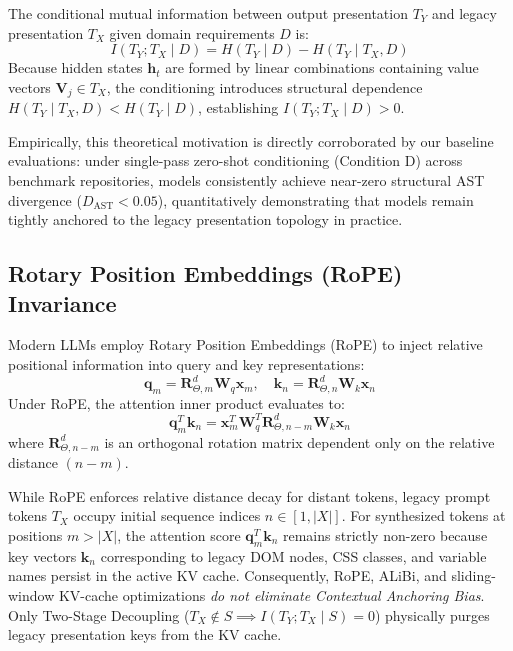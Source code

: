 \documentclass[10pt,journal,compsoc]{IEEEtran}
\begin{document}
The conditional mutual information between output presentation $T_Y$ and legacy presentation $T_X$ given domain requirements $D$ is:
\begin{equation}
I(T_Y ; T_X \mid D) = H(T_Y \mid D) - H(T_Y \mid T_X, D)
\end{equation}
Because hidden states $\mathbf{h}_t$ are formed by linear combinations containing value vectors $\mathbf{V}_j \in T_X$, the conditioning introduces structural dependence $H(T_Y \mid T_X, D) < H(T_Y \mid D)$, establishing $I(T_Y ; T_X \mid D) > 0$.

Empirically, this theoretical motivation is directly corroborated by our baseline evaluations: under single-pass zero-shot conditioning (Condition D) across benchmark repositories, models consistently achieve near-zero structural AST divergence ($D_{\text{AST}} < 0.05$), quantitatively demonstrating that models remain tightly anchored to the legacy presentation topology in practice.

\subsection{Rotary Position Embeddings (RoPE) Invariance}
Modern LLMs employ Rotary Position Embeddings (RoPE) \cite{su2024roformer} to inject relative positional information into query and key representations:
\begin{equation}
\mathbf{q}_m = \mathbf{R}_{\Theta, m}^d \mathbf{W}_q \mathbf{x}_m, \quad \mathbf{k}_n = \mathbf{R}_{\Theta, n}^d \mathbf{W}_k \mathbf{x}_n
\end{equation}
Under RoPE, the attention inner product evaluates to:
\begin{equation}
\mathbf{q}_m^T \mathbf{k}_n = \mathbf{x}_m^T \mathbf{W}_q^T \mathbf{R}_{\Theta, n-m}^d \mathbf{W}_k \mathbf{x}_n
\end{equation}
where $\mathbf{R}_{\Theta, n-m}^d$ is an orthogonal rotation matrix dependent only on the relative distance $(n-m)$. 

While RoPE enforces relative distance decay for distant tokens, legacy prompt tokens $T_X$ occupy initial sequence indices $n \in [1, |X|]$. For synthesized tokens at positions $m > |X|$, the attention score $\mathbf{q}_m^T \mathbf{k}_n$ remains strictly non-zero because key vectors $\mathbf{k}_n$ corresponding to legacy DOM nodes, CSS classes, and variable names persist in the active KV cache. Consequently, RoPE, ALiBi, and sliding-window KV-cache optimizations \textit{do not eliminate Contextual Anchoring Bias}. Only Two-Stage Decoupling ($T_X \notin S \implies I(T_Y; T_X \mid S) = 0$) physically purges legacy presentation keys from the KV cache.
\end{document}
